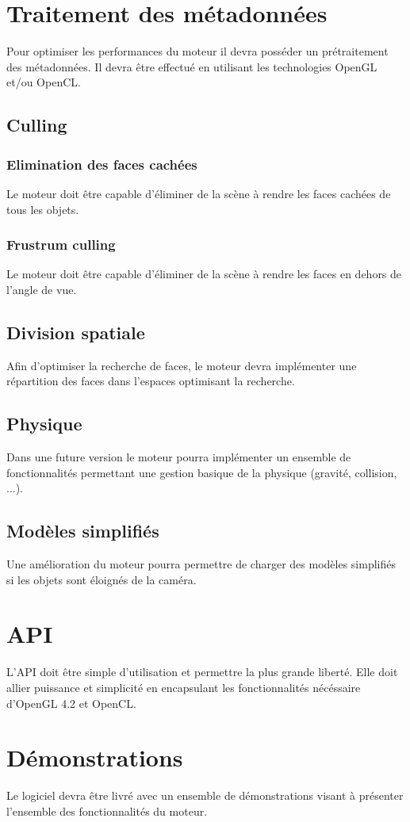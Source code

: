 \documentclass [a4 paper,11pt]{article}
\begin{document}
\section{Traitement des métadonnées}
Pour optimiser les performances du moteur il devra posséder un prétraitement des métadonnées.
Il devra être effectué en utilisant les technologies OpenGL et/ou OpenCL.

\subsection{Culling}
\subsubsection*{Elimination des faces cachées}
Le moteur doit être capable d'éliminer de la scène à rendre les faces cachées de tous les objets.
\subsubsection*{Frustrum culling}
Le moteur doit être capable d'éliminer de la scène à rendre les faces en dehors de l'angle de vue.

\subsection{Division spatiale}
Afin d'optimiser la recherche de faces, le moteur devra implémenter une répartition des faces dans l'espaces optimisant la recherche.

\subsection{Physique}
Dans une future version le moteur pourra implémenter un ensemble de fonctionnalités permettant une gestion basique de la physique (gravité, collision, ...).

\subsection{Modèles simplifiés}
Une amélioration du moteur pourra permettre de charger des modèles simplifiés si les objets sont éloignés de la caméra.

\section{API}
L'API doit être simple d'utilisation et permettre la plus grande liberté.
Elle doit allier puissance et simplicité en encapsulant les fonctionnalités nécéssaire d'OpenGL 4.2 et OpenCL.

\section{Démonstrations}
Le logiciel devra être livré avec un ensemble de démonstrations visant à présenter l'ensemble des fonctionnalités du moteur.
\end{document}
